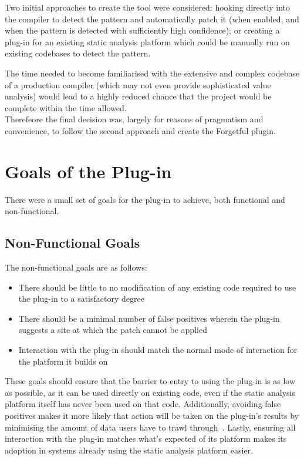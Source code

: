 Two initial approaches to create the tool were considered: hooking directly into the compiler to detect the pattern and automatically patch it (when enabled, and when the pattern is detected with sufficiently high confidence); or creating a plug-in for an existing static analysis platform which could be manually run on existing codebases to detect the pattern.

The time needed to become familiarised with the extensive and complex codebase of a production compiler (which may not even provide sophisticated value analysis) would lead to a highly reduced chance that the project would be complete within the time allowed. \\
Therefeore the final decision was, largely for reasons of pragmatism and convenience, to follow the second approach and create the Forgetful plugin.

\section{Goals of the Plug-in}

There were a small set of goals for the plug-in to achieve, both functional and non-functional.

\subsection{Non-Functional Goals}

The non-functional goals are as follows:

\begin{itemize}
	\item There should be little to no modification of any existing code required to use the plug-in to a satisfactory degree
	\item There should be a minimal number of false positives wherein the plug-in suggests a site at which the patch cannot be applied
	\item Interaction with the plug-in should match the normal mode of interaction for the platform it builds on
\end{itemize}

These goals should ensure that the barrier to entry to using the plug-in is as low as possible, as it can be used directly on existing code, even if the static analysis platform itself has never been used on that code. Additionally, avoiding false positives makes it more likely that action will be taken on the plug-in's results by minimising the amount of data users have to trawl through~\cite{infervideo}. Lastly, ensuring all interaction with the plug-in matches what's expected of its platform makes its adoption in systems already using the static analysis platform easier.

